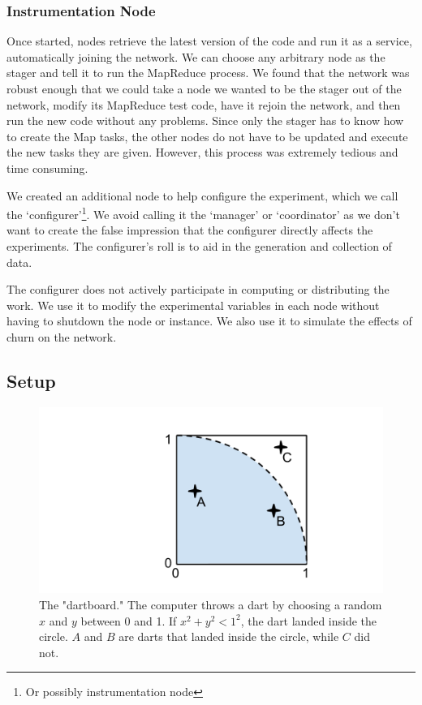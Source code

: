 \documentclass[10pt, conference, compsocconf]{IEEEtran}
\begin{document}
\subsubsection*{Instrumentation Node}
Once started, nodes retrieve the latest version of the code and run it as a service, automatically joining the network.  We can choose any arbitrary node as the stager and tell it to run the MapReduce process. We found that the network was robust enough that we could take a node we wanted to be the stager out of the network, modify its MapReduce test code, have it rejoin the network, and then run the new code without any problems. Since only the stager has to know how to create the Map tasks, the other nodes do not have to be updated and execute the new tasks they are given.  However, this process was extremely tedious and time consuming.

We created an additional node to help configure the experiment, which we call the `configurer'\footnote{Or possibly instrumentation node}.  We avoid calling it the `manager' or `coordinator' as we don't want to create the false impression that the configurer directly affects the experiments.  The configurer's roll is to aid in the generation and collection of data. 

The configurer does not actively participate in computing or distributing the work.  We use it to modify the experimental variables in each node without having to shutdown the node or instance. We also use it to simulate the effects of churn on the network.

\subsection{Setup}

\begin{figure}
    \includegraphics[width=\linewidth]{dartboard}
    \caption{The "dartboard." The computer throws a dart by choosing a random $x$ and $y$ between 0 and 1.  If $x^{2} + y^{2} < 1^{2} $, the dart landed inside the circle.  $A$ and $B$ are darts that landed inside the circle, while $C$ did not.}
    \label{dartboard}
\end{figure}
\end{document}

